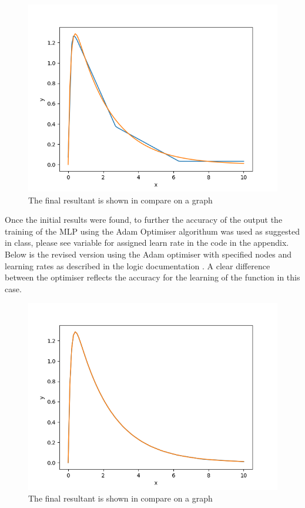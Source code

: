 \documentclass[a4paper, 10pt]{IEEEconf}
\begin{document}
\begin{figure}[H]
  \includegraphics[width=0.8\linewidth, center]{images/plot}
  \caption{The final resultant is shown in compare on a graph}
  \label{fig:The final resultant is shown in compare on a graph}
\end{figure}

Once the initial results were found, to further the accuracy of the output the training of the MLP using the Adam Optimiser algorithum was used as suggested in class, please see variable for assigned learn rate in the code in the appendix. Below is the revised version using the Adam optimiser with specified nodes and learning rates as described in the logic documentation \cite{adam}. A clear difference between the optimiser reflects the accuracy for the learning of the function in this case.

\begin{figure}[H]
  \includegraphics[width=0.8\linewidth, center]{images/3}
  \caption{The final resultant is shown in compare on a graph}
  \label{fig:The final resultant is shown in compare on a graph}
\end{figure}
\end{document}
